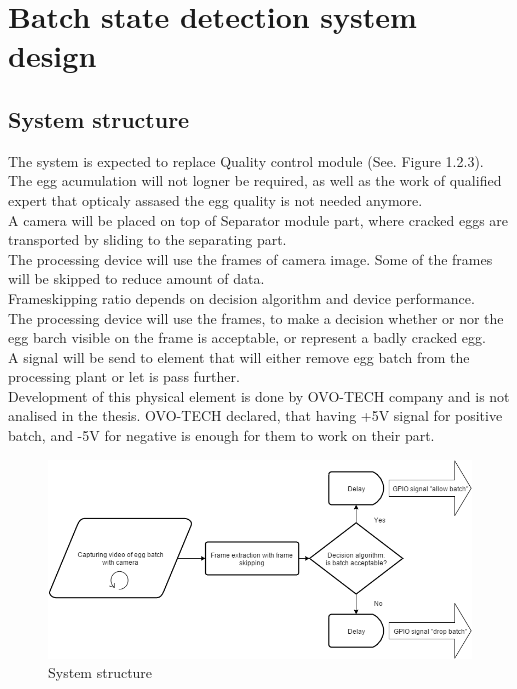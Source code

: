 \documentclass[12pt,twoside,a4paper]{article}
\begin{document}
\section{Batch state detection system design}

\subsection{System structure}
The system is expected to replace Quality control module (See. Figure 1.2.3).\\
The egg acumulation will not logner be required, as well as the work of qualified expert that opticaly assased the egg quality is not needed anymore.\\

A camera will be placed on top of Separator module part, where cracked eggs are transported by sliding to the separating part.\\

The processing device will use the frames of camera image. Some of the frames will be skipped to reduce amount of data.\\
Frameskipping ratio depends on decision algorithm and device performance.\\

The processing device will use the frames, to make a decision whether or nor the egg barch visible on the frame is acceptable, or represent a badly cracked egg.\\
A signal will be send to element that will either remove egg batch from the processing plant or let is pass further.\\

Development of this physical element is done by OVO-TECH company and is not analised in the thesis. OVO-TECH declared, that having +5V signal for positive batch, and -5V for negative is enough for them to work on their part.


\begin{figure}[H]
\centering
\includegraphics[width=0.8\paperwidth]{system}
\caption{System structure}
\end{figure}
\end{document}
